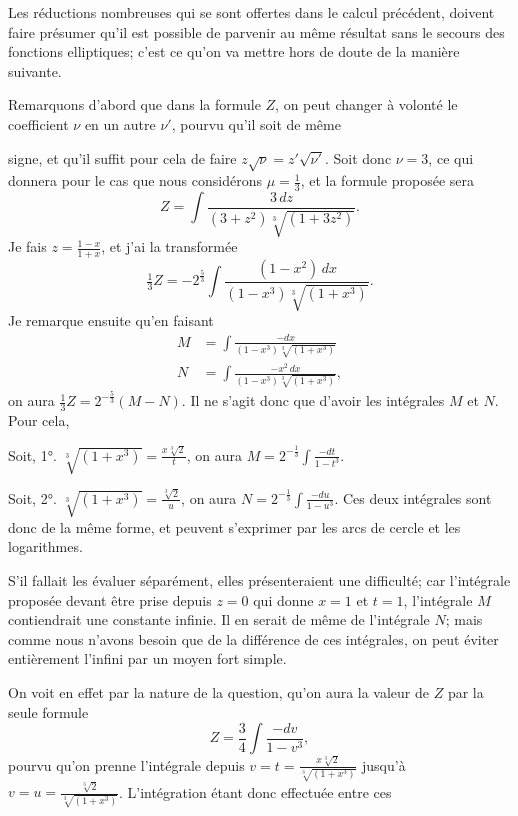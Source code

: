 \documentclass{article}
\begin{document}
Les réductions nombreuses qui se sont offertes dans le calcul précédent, doivent faire présumer qu'il est possible de parvenir au même résultat sans le secours des fonctions elliptiques; c'est ce qu'on va mettre hors de doute de la manière suivante.

Remarquons d'abord que dans la formule $Z$, on peut changer à volonté le coefficient $\nu$ en un autre $\nu'$, pourvu qu'il soit de même

signe, et qu'il suffit pour cela de faire $z\sqrt{\nu}=z'\sqrt{\nu'}$. Soit donc $\nu=3$, ce qui donnera pour le cas que nous considérons $\mu=\frac{1}{3}$, et la formule proposée sera
\[ Z=\int\frac{3\,dz}{(3+z^{2})\sqrt[3]{(1+3z^{2})}}. \]
Je fais $z=\frac{1-x}{1+x}$, et j'ai la transformée
\[ \tfrac{1}{3}Z=-2^{\frac{5}{3}}\int\frac{(1-x^{2})\,dx}{(1-x^{3})\sqrt[3]{(1+x^{3})}}. \]
Je remarque ensuite qu'en faisant
\[ \begin{aligned} M&=\int\frac{-dx}{(1-x^{3})\sqrt[3]{(1+x^{3})}}\\ N&=\int\frac{-x^{2}\,dx}{(1-x^{3})\sqrt[3]{(1+x^{3})}}, \end{aligned} \]
on aura $\frac{1}{3}Z=2^{-\frac{5}{3}}(M-N)$. Il ne s'agit donc que d'avoir les intégrales $M$ et $N$. Pour cela,

Soit, 1°. $\sqrt[3]{(1+x^{3})}=\frac{x\sqrt[3]{2}}{t}$, on aura $M=2^{-\frac{1}{3}}\displaystyle\int\frac{-dt}{1-t^{3}}$.

Soit, 2°. $\sqrt[3]{(1+x^{3})}=\frac{\sqrt[3]{2}}{u}$, on aura $N=2^{-\frac{1}{3}}\displaystyle\int\frac{-du}{1-u^{3}}$.
Ces deux intégrales sont donc de la même forme, et peuvent s'exprimer par les arcs de cercle et les logarithmes.

S'il fallait les évaluer séparément, elles présenteraient une difficulté; car l'intégrale proposée devant être prise depuis $z=0$ qui donne $x=1$ et $t=1$, l'intégrale $M$ contiendrait une constante infinie. Il en serait de même de l'intégrale $N$; mais comme nous n'avons besoin que de la différence de ces intégrales, on peut éviter entièrement l'infini par un moyen fort simple.

On voit en effet par la nature de la question, qu'on aura la valeur de $Z$ par la seule formule
\[ Z=\frac{3}{4}\int\frac{-dv}{1-v^{3}}, \]
pourvu qu'on prenne l'intégrale depuis $v=t=\frac{x\sqrt[3]{2}}{\sqrt[3]{(1+x^{3})}}$ jusqu'à $v=u=\frac{\sqrt[3]{2}}{\sqrt[3]{(1+x^{3})}}$. L'intégration étant donc effectuée entre ces
\end{document}
